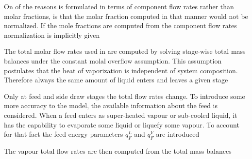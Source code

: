 
        On of the reasons  is formulated in terms of component flow rates rather
        than molar fractions, is that the molar fraction computed in that manner would not be normalized. If
        the mole fractions are computed from the component flow rates normalization is implicitly given


        The total molar flow rates used in  are computed by solving
        stage-wise total mass balances under the constant molal overflow assumption. This assumption
        postulates that the heat of vaporization is independent of system composition.
        Therefore always the same amount of liquid enters and leaves a given stage

        Only at feed and side draw stages the total flow rates change. To introduce some more accuracy
        to the model, the available information about the feed is considered. When a feed enters as
        super-heated vapour or sub-cooled liquid, it has the capability to evaporate some liquid or
        liquefy some vapour. To account for that fact the feed energy parameters $q_F^L$ and $q_F^V$
        are introduced

        The vapour total flow rates are then computed from the total mass balances

